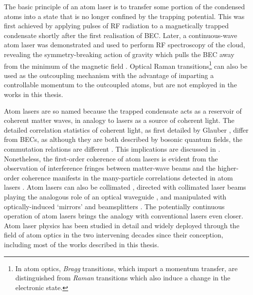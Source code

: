 	The basic principle of an atom laser is to transfer some portion of the condensed atoms into a state that is no longer confined by the trapping potential. This was first achieved by applying pulses of RF radiation to a magnetically trapped condensate shortly after the first realisation of BEC\cite{mewes97}. Later, a continuous-wave atom laser was demonstrated and used to perform RF spectroscopy of the cloud, revealing the symmetry-breaking action of gravity which pulls the BEC away from the minimum of the magnetic field \cite{bloch99}. Optical Raman transitions\footnote{In atom optics, \emph{Bragg} transitions, which impart a momentum transfer, are distinguished from  \emph{Raman} transitions which also induce a change in the electronic state.} can also be used as the outcoupling mechanism \cite{Hagley99} with the advantage of imparting a controllable momentum to the outcoupled atoms, but are not employed in the works in this thesis. 

	Atom lasers are so named because the trapped condensate acts as a reservoir of coherent matter waves, in analogy to lasers as a source of coherent light. The detailed correlation statistics of coherent light, as first detailed by Glauber \cite{glauberXX}, differ from BECs, as although they are both described by bosonic quantum fields, the commutation relations are different . This implications are discussed in \cite{narashewski}. Nonetheless, the first-order coherence of atom lasers is evident from the observation of interference fringes between matter-wave beams \cite{andrews97} and the higher-order coherence manifests in the many-particle correlations detected in \mhe atom lasers \cite{SomeMorePapers}. Atom lasers can also be collimated \cite{bloch99}, directed with collimated laser beams playing the analogous role of an optical waveguide \cite{Guerin06,couvert08}, and manipulated with optically-induced `mirrors' and beamsplitters \cite{Bloch01}. The potentially continuous operation of atom lasers \cite{Chikkatur02} brings the analogy with conventional lasers even closer. Atom laser physics has been studied in detail and widely deployed through the field of atom optics in the two intervening decades since their conception, including most of the works described in this thesis.


